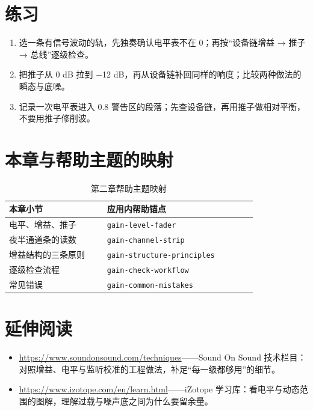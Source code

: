 \section{练习}


\begin{exercise}
\begin{enumerate}
  \item 选一条有信号波动的轨，先独奏确认电平表不在 0；再按“设备链增益 → 推子 → 总线”逐级检查。
  \item 把推子从 0 dB 拉到 −12 dB，再从设备链补回同样的响度；比较两种做法的瞬态与底噪。
  \item 记录一次电平表进入 0.8 警告区的段落；先查设备链，再用推子做相对平衡，不要用推子修削波。
\end{enumerate}
\end{exercise}

\section{本章与帮助主题的映射}

\begin{table}[htbp]
\centering
\small
\begin{tabular}{@{}p{0.34\linewidth}p{0.52\linewidth}@{}}
\hline
本章小节 & 应用内帮助锚点 \\
\hline
电平、增益、推子 & \texttt{gain-level-fader} \\
夜半通道条的读数 & \texttt{gain-channel-strip} \\
增益结构的三条原则 & \texttt{gain-structure-principles} \\
逐级检查流程 & \texttt{gain-check-workflow} \\
常见错误 & \texttt{gain-common-mistakes} \\
\hline
\end{tabular}
\caption{第二章帮助主题映射}
\end{table}

\section*{延伸阅读}
\begin{itemize}[leftmargin=1.5em]
\item \url{https://www.soundonsound.com/techniques}——Sound On Sound 技术栏目：对照增益、电平与监听校准的工程做法，补足“每一级都够用”的细节。
\item \url{https://www.izotope.com/en/learn.html}——iZotope 学习库：看电平与动态范围的图解，理解过载与噪声底之间为什么要留余量。
\end{itemize}
